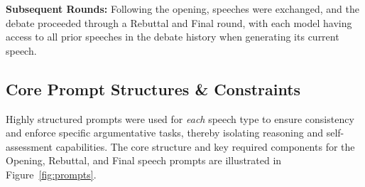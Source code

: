 \documentclass{article}
\begin{document}
\textbf{Subsequent Rounds:} Following the opening, speeches were exchanged, and the debate proceeded through a Rebuttal and Final round, with each model having access to all prior speeches in the debate history when generating its current speech.

\subsection{Core Prompt Structures \& Constraints}
\label{subsec:prompts}
Highly structured prompts were used for \textit{each} speech type to ensure consistency and enforce specific argumentative tasks, thereby isolating reasoning and self-assessment capabilities. The core structure and key required components for the Opening, Rebuttal, and Final speech prompts are illustrated in Figure~\ref{fig:prompts}.
\end{document}
